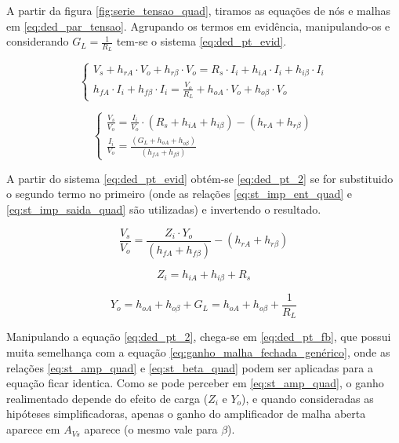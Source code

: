 \documentclass[openright]{normas-utf-tex} %
\begin{document}
A partir da figura \ref{fig:serie_tensao_quad}, tiramos as equações de nós e malhas em \ref{eq:ded_par_tensao}. Agrupando os termos em evidência, manipulando-os e considerando $G_L = \frac{1}{R_L}$ tem-se o sistema \ref{eq:ded_pt_evid}.

\begin{equation}\label{eq:ded_par_tensao}
\begin{cases}
V_s + h_{rA} \cdot V_o + h_{r\beta} \cdot V_o = R_s \cdot I_i + h_{iA} \cdot I_i + h_{i\beta} \cdot I_i

\\
h_{fA} \cdot I_i + h_{f\beta} \cdot I_i = \frac{V_o}{R_L} + h_{oA} \cdot V_o + h_{o\beta} \cdot V_o
\end{cases}
\end{equation}

\begin{equation}\label{eq:ded_pt_evid}
\begin{cases}
\frac{V_s}{V_o} = \frac{I_i}{V_o} \cdot \left( R_s + h_{iA} + h_{i\beta} \right) - \left( h_{rA} + h_{r\beta} \right)

\\
\frac{I_i}{V_o} =  \frac{\left( G_L + h_{oA} + h_{o\beta} \right)}{\left( h_{fA} + h_{f\beta} \right)}
\end{cases}
\end{equation}

A partir do sistema \ref{eq:ded_pt_evid} obtém-se \ref{eq:ded_pt_2} se for substituido o segundo termo no primeiro (onde as relações \ref{eq:st_imp_ent_quad} e \ref{eq:st_imp_saida_quad} são utilizadas) e invertendo o resultado.

\begin{equation}\label{eq:ded_pt_2}
\frac{V_s}{V_o} = \frac{Z_i \cdot Y_o}{\left( h_{fA} + h_{f\beta} \right)} - \left( h_{rA} + h_{r\beta}\right)
\end{equation}

\begin{equation}\label{eq:st_imp_ent_quad}
Z_i = h_{iA} + h_{i\beta} + R_s
\end{equation}

\begin{equation}\label{eq:st_imp_saida_quad}
Y_o = h_{oA} + h_{o\beta} + G_L
= h_{oA} + h_{o\beta} + \frac{1}{R_L}
\end{equation}

Manipulando a equação \ref{eq:ded_pt_2}, chega-se em \ref{eq:ded_pt_fb}, que possui muita semelhança com a equação \ref{eq:ganho_malha_fechada_genérico}, onde as relações \ref{eq:st_amp_quad} e \ref{eq:st_beta_quad} podem ser aplicadas para a equação ficar identica. Como se pode perceber em \ref{eq:st_amp_quad}, o ganho realimentado depende do efeito de carga ($Z_i$ e $Y_o$), e quando consideradas as hipóteses simplificadoras, apenas o ganho do amplificador de malha aberta aparece em $A_{Vs}$ aparece (o mesmo vale para $\beta$). \cite{pedroni,millman}
\end{document}
